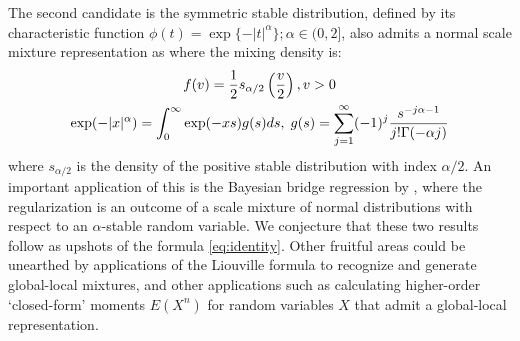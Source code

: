 \documentclass[lineno]{biometrika}
\begin{document}
The second candidate is the symmetric stable distribution, defined by its characteristic function $\phi(t) = \exp\{ -|t|^{\alpha} \}; \alpha \in (0,2]$, also admits a normal scale mixture representation as where the mixing density is: 
\begin{gather*}
f(v) = \frac{1}{2} s_{\alpha/2} \left( \frac{v}{2} \right), v > 0 \\
\exp(-|x|^\alpha) = \int_0^{\infty} \exp(-xs) g(s) ds, \; g(s) = \sum_{j=1}^{\infty} (-1)^j \frac{s^{-j\alpha-1}}{j! \Gamma(-\alpha j)}
\end{gather*}
where $s_{\alpha/2}$ is the density of the positive stable distribution with index $\alpha / 2$. An important application of this is the Bayesian bridge regression by \cite{polson2014bayesian}, where the regularization is an outcome of a scale mixture of normal distributions with respect to an $\alpha$-stable random variable. We conjecture that these two results follow as upshots of the \CS formula \eqref{eq:identity}. Other fruitful areas could be unearthed by applications of the Liouville formula to recognize and generate global-local mixtures, and other applications such as calculating higher-order `closed-form' moments $E(X^n)$ for random variables $X$ that admit a global-local representation. 

%


\end{document}
